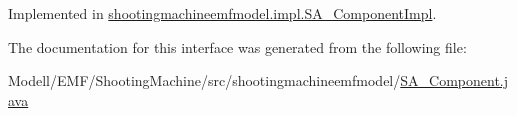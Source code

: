 Implemented in \hyperlink{classshootingmachineemfmodel_1_1impl_1_1_s_a___component_impl_a4e201e8a6ffc5a7434539c6b2d36e1e4}{shootingmachineemfmodel.\-impl.\-S\-A\-\_\-\-Component\-Impl}.



The documentation for this interface was generated from the following file\-:\begin{DoxyCompactItemize}
\item 
Modell/\-E\-M\-F/\-Shooting\-Machine/src/shootingmachineemfmodel/\hyperlink{_s_a___component_8java}{S\-A\-\_\-\-Component.\-java}\end{DoxyCompactItemize}
